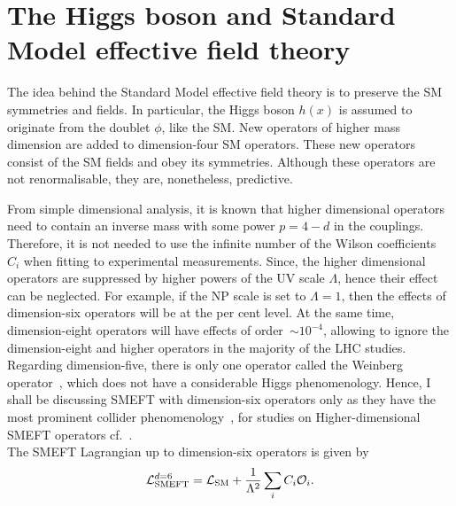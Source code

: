 \section{The Higgs boson and Standard Model effective field theory \label{sec:smeft}}
\par The idea behind the Standard Model effective field theory is to preserve the SM symmetries and fields. In particular, the Higgs boson $h(x)$ is assumed to originate from the doublet $\phi$, like the SM.  New operators of higher mass dimension are added to dimension-four SM operators. These new operators consist of the SM fields and obey its symmetries. Although these operators are not renormalisable, they are, nonetheless, predictive.
\par From simple dimensional analysis, it is known that higher dimensional operators need to contain an inverse mass with some power $p=4-d$ in the couplings. Therefore, it is not needed to use the infinite number of the Wilson coefficients~$C_i$ when fitting to experimental measurements. Since, the higher dimensional operators are suppressed by higher powers of the UV scale $\Lambda$, hence their effect can be neglected. For example, if the NP scale is set to  $\Lambda =1$, then the effects of dimension-six operators will be at the per cent level. At the same time, dimension-eight operators will have effects of order~$\sim10^{-4}$, allowing to ignore the dimension-eight and higher operators in the majority of the LHC studies.  Regarding dimension-five, there is only one operator called the Weinberg operator~\cite{PhysRevLett.43.1566}, which does not have a considerable Higgs phenomenology. Hence, I shall be discussing SMEFT with dimension-six operators only as  they have the most prominent collider phenomenology~\cite{BUCHMULLER1986621,Hagiwara:1993ck}, for studies on Higher-dimensional SMEFT operators cf.~\cite{Lehman:2014jma,Lehman:2015coa,Henning:2015alf,Aguilar-Saavedra:2010uur}. \\ The SMEFT Lagrangian up to dimension-six operators is given by
\begin{equation}
	\mathcal{L}_{\mathrm{SMEFT}}^{d=6}=\mathcal{L}_{\mathrm{SM}} + \frac{1}{\Lambda^2}\sum_i C_i  {\cal O}_i.
	\label{smeftdim6}
\end{equation}

